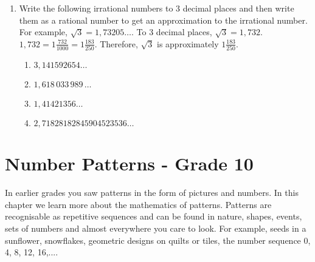 \documentclass[10pt,a4paper,titlepage,twoside,openright]{report}
\begin{document}
\begin{enumerate}
{}
\item{Write the following irrational numbers to 3 decimal places and then write them as a rational number to get an approximation to the irrational number. For example, $\sqrt{3}=1,73205\ldots$. To 3 decimal places, $\sqrt{3}=1,732$. $1,732=1\frac{732}{1000}=1\frac{183}{250}$. Therefore, $\sqrt{3}$ is approximately $1\frac{183}{250}$.
\begin{enumerate}
\item{$3,141592654\ldots$}
\item{$1,618\,033\,989\,\ldots$}
\item{$1,41421356\ldots$}
\item{$2,71828 18284 59045 23536\ldots$}
\end{enumerate}
}

\end{enumerate}







\chapter{Number Patterns - Grade 10}
\label{m:pin:g10}


In earlier grades you saw patterns in the form of pictures and numbers. In this chapter we learn more about the mathematics of patterns. Patterns are recognisable as repetitive sequences and can be found in nature, shapes, events, sets of numbers and almost everywhere you care to look. For example, seeds in a sunflower, snowflakes, geometric designs on quilts or tiles, the number sequence {0, 4, 8, 12, 16,...}. 

\end{document}
